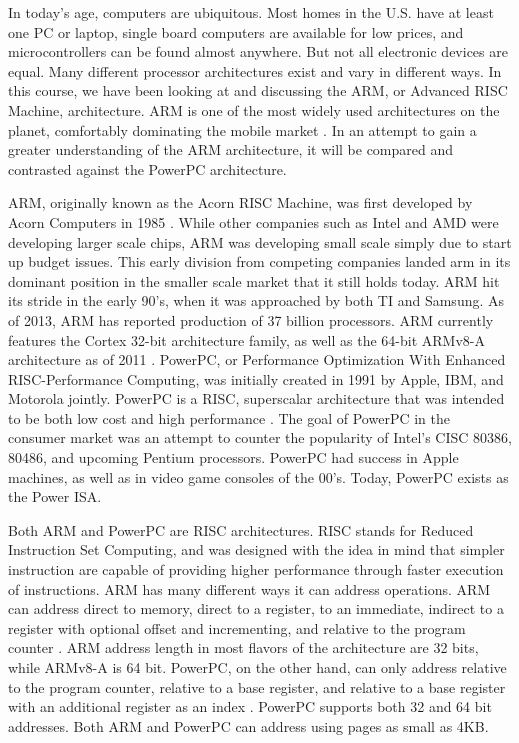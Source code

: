 \documentclass[letterpaper,10pt,onecolumn,titlepage]{article}
\begin{document}


\par
In today's age, computers are ubiquitous. Most homes in the U.S. have at least one PC or
laptop, single board computers are available for low prices, and microcontrollers can be
found almost anywhere. But not all electronic devices are equal. Many different processor
architectures exist and vary in different ways. In this course, we have been looking at
and discussing the ARM, or Advanced RISC Machine, architecture. ARM is one of the most
widely used architectures on the planet, comfortably dominating the mobile market
\cite{Bent}. In an attempt to gain a greater understanding of the ARM architecture, it 
will be compared and contrasted against the PowerPC architecture.

\par
ARM, originally known as the Acorn RISC Machine, was first developed by Acorn Computers 
in 1985 \cite{Levy}. While other companies such as Intel and AMD were developing larger scale
chips, ARM was developing small scale simply due to start up budget issues. This early
division from competing companies landed arm in its dominant position in the smaller scale
market that it still holds today. ARM hit its stride in the early 90's, when it was
approached by both TI and Samsung. As of 2013, ARM has reported production of 37 billion
processors. ARM currently features the Cortex 32-bit architecture family, as well as
the 64-bit ARMv8-A architecture as of 2011 \cite{Grisenthwaite}. PowerPC, or Performance Optimization With
Enhanced RISC-Performance Computing, was initially created in 1991 by Apple, IBM, and
Motorola jointly. PowerPC is a RISC, superscalar architecture that was intended to be both
low cost and high performance \cite{Tech}. The goal of PowerPC in the consumer market was an
attempt to counter the popularity of Intel's CISC 80386, 80486, and upcoming Pentium
processors. PowerPC had success in Apple machines, as well as in video game consoles of
the 00's. Today, PowerPC exists as the Power ISA.

\par
Both ARM and PowerPC are RISC architectures. RISC stands for Reduced Instruction Set
Computing, and was designed with the idea in mind that simpler instruction are capable
of providing higher performance through faster execution of instructions. ARM has many
different ways it can address operations. ARM can address direct to memory, direct to a
register, to an immediate, indirect to a register with optional offset and incrementing,
and relative to the program counter \cite{Regina}. ARM address length in most flavors of the
architecture are 32 bits, while ARMv8-A is 64 bit. PowerPC, on the other hand, can only address
relative to the program counter, relative to a base register, and relative to a base
register with an additional register as an index \cite{Physinfo}. PowerPC supports both 32 and 64 bit
addresses. Both ARM and PowerPC can address using pages as small as 4KB.
\end{document}
